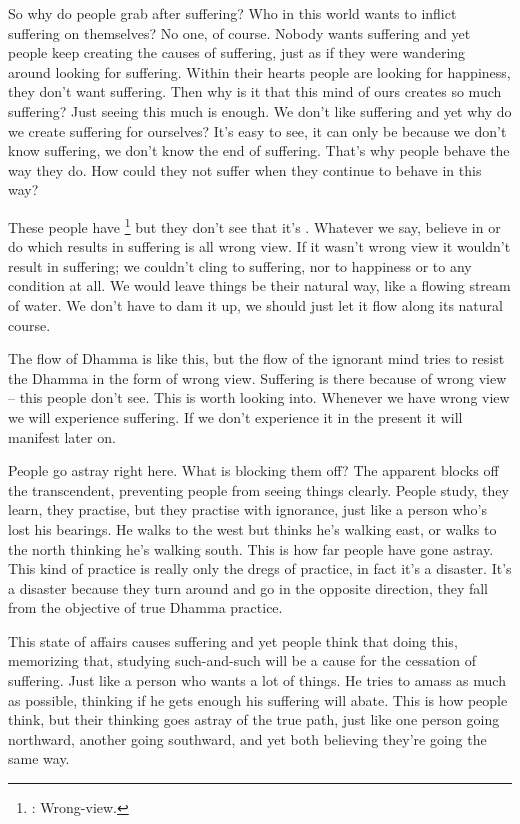 So why do people grab after suffering? Who in this world wants to inflict suffering on themselves? No one, of course. Nobody wants suffering and yet people keep creating the causes of suffering, just as if they were wandering around looking for suffering. Within their hearts people are looking for happiness, they don't want suffering. Then why is it that this mind of ours creates so much suffering? Just seeing this much is enough. We don't like suffering and yet why do we create suffering for ourselves? It's easy to see, it can only be because we don't know suffering, we don't know the end of suffering. That's why people behave the way they do. How could they not suffer when they continue to behave in this way? 

These people have \footnote{: Wrong-view.} but they don't see that it's . Whatever we say, believe in or do which results in suffering is all wrong view. If it wasn't wrong view it wouldn't result in suffering; we couldn't cling to suffering, nor to happiness or to any condition at all. We would leave things be their natural way, like a flowing stream of water. We don't have to dam it up, we should just let it flow along its natural course. 

The flow of Dhamma is like this, but the flow of the ignorant mind tries to resist the Dhamma in the form of wrong view. Suffering is there because of wrong view -- this people don't see. This is worth looking into. Whenever we have wrong view we will experience suffering. If we don't experience it in the present it will manifest later on. 

People go astray right here. What is blocking them off? The apparent blocks off the transcendent, preventing people from seeing things clearly. People study, they learn, they practise, but they practise with ignorance, just like a person who's lost his bearings. He walks to the west but thinks he's walking east, or walks to the north thinking he's walking south. This is how far people have gone astray. This kind of practice is really only the dregs of practice, in fact it's a disaster. It's a disaster because they turn around and go in the opposite direction, they fall from the objective of true Dhamma practice. 

This state of affairs causes suffering and yet people think that doing this, memorizing that, studying such-and-such will be a cause for the cessation of suffering. Just like a person who wants a lot of things. He tries to amass as much as possible, thinking if he gets enough his suffering will abate. This is how people think, but their thinking goes astray of the true path, just like one person going northward, another going southward, and yet both believing they're going the same way. 

